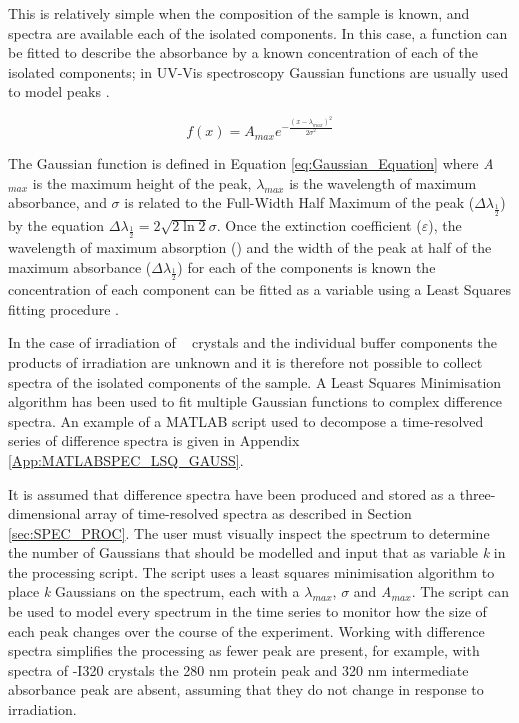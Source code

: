 This is relatively simple when the composition of the sample is known, and spectra are available each of the isolated components. In this case, a function can be fitted to describe the absorbance by a known concentration of each of the isolated components; in UV-Vis spectroscopy Gaussian functions are usually used to model peaks \cite{Antonov2000}.  

\begin{equation}\label{eq:Gaussian_Equation}
f (x) = A_{max} e^{-\frac{(x-\lambda_{max})^2}{2\sigma^2}}
\end{equation} 

The Gaussian function is defined in Equation \ref{eq:Gaussian_Equation} where \textit{A$_{max}$} is the maximum height of the peak, $\lambda_{max}$ is the wavelength of maximum absorbance, and \textit{$\sigma$} is related to the Full-Width Half Maximum of the peak ($\Delta\lambda_{\frac{1}{2}}$) by the equation $ \Delta\lambda_{\frac{1}{2}} = 2 \sqrt{2\ln2}\sigma$. Once the extinction coefficient ($\varepsilon$), the wavelength of maximum absorption (\lwl) and the width of the peak at half of the maximum absorbance ($\Delta\lambda_{\frac{1}{2}}$) for each of the components is known the concentration of each component can be fitted as a variable using a Least Squares fitting procedure \cite{Gonen2009}.          

In the case of irradiation of \atpdx~ crystals and the individual buffer components the products of irradiation are unknown and it is therefore not possible to collect spectra of the isolated components of the sample. A Least Squares Minimisation algorithm has been used to fit multiple Gaussian functions to complex difference spectra. An example of a MATLAB script used to decompose a time-resolved series of difference spectra is given in Appendix \ref{App:MATLABSPEC_LSQ_GAUSS}. 

It is assumed that difference spectra have been produced and stored as a three-dimensional array of time-resolved spectra as described in Section \ref{sec:SPEC_PROC}. The user must visually inspect the spectrum to determine the number of Gaussians that should be modelled and input that as variable \textit{k} in the processing script. The script uses a least squares minimisation algorithm to place \textit{k} Gaussians on the spectrum, each with a $\lambda_{max}$, \textit{$\sigma$} and \textit{A$_{max}$}. The script can be used to model every spectrum in the time series to monitor how the size of each peak changes over the course of the experiment. Working with difference spectra simplifies the processing as fewer peak are present, for example, with spectra of \atpdx -I320 crystals the 280 nm protein peak and 320 nm intermediate absorbance peak are absent, assuming that they do not change in response to irradiation.

